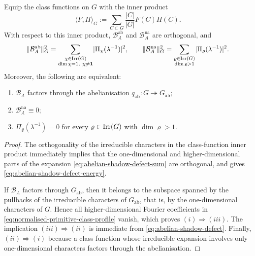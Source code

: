 \begin{proposition}
  \label{thm:abelian-shadow-defect}
  Equip the class functions on \(G\) with the inner product
  \[
    \langle F,H\rangle_G
    :=
    \sum_{C\subset G}\frac{|C|}{|G|}F(C)\overline{H(C)}.
  \]
  With respect to this inner product,
  \(\mathcal B_A^{\mathrm{ab}}\) and \(\mathcal B_A^{\mathrm{na}}\)
  are orthogonal, and
  \begin{equation}\label{eq:abelian-shadow-defect-energy}
    \lVert \mathcal B_A^{\mathrm{ab}} \rVert_G^2
    =
    \sum_{\substack{\chi\in\operatorname{Irr}(G)\\ \dim\chi=1,\ \chi\neq \mathbf 1}}
      \lvert \Pi_\chi(\lambda^{-1}) \rvert^2,
    \qquad
    \lVert \mathcal B_A^{\mathrm{na}} \rVert_G^2
    =
    \sum_{\substack{\varrho\in\operatorname{Irr}(G)\\ \dim\varrho>1}}
      \lvert \Pi_\varrho(\lambda^{-1}) \rvert^2.
  \end{equation}
  Moreover, the following are equivalent:
  \begin{enumerate}[label=\textup{(\roman*)}]
    \item \(\mathcal B_A\) factors through the abelianisation
      \(q_{\mathrm{ab}}:G\twoheadrightarrow G_{\mathrm{ab}}\);
    \item \(\mathcal B_A^{\mathrm{na}}\equiv 0\);
    \item \(\Pi_\varrho(\lambda^{-1})=0\) for every
      \(\varrho\in\operatorname{Irr}(G)\) with \(\dim\varrho>1\).
  \end{enumerate}
\end{proposition}

\begin{proof}
  The orthogonality of the irreducible characters in the class-function
  inner product immediately implies that the one-dimensional and
  higher-dimensional parts of the expansion
  \eqref{eq:abelian-shadow-defect-sum} are orthogonal, and gives
  \eqref{eq:abelian-shadow-defect-energy}.

  If \(\mathcal B_A\) factors through \(G_{\mathrm{ab}}\), then it
  belongs to the subspace spanned by the pullbacks of the irreducible
  characters of \(G_{\mathrm{ab}}\), that is, by the one-dimensional
  characters of \(G\). Hence all higher-dimensional Fourier coefficients
  in \eqref{eq:normalised-primitive-class-profile} vanish, which proves
  \((i)\Rightarrow(iii)\). The implication \((iii)\Rightarrow(ii)\) is
  immediate from \eqref{eq:abelian-shadow-defect}. Finally,
  \((ii)\Rightarrow(i)\) because a class function whose irreducible
  expansion involves only one-dimensional characters factors through the
  abelianisation.
\end{proof}

